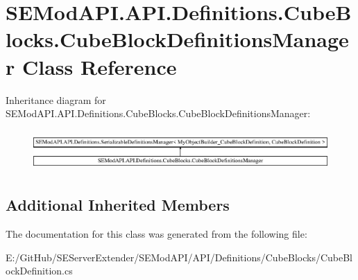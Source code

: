 \hypertarget{class_s_e_mod_a_p_i_1_1_a_p_i_1_1_definitions_1_1_cube_blocks_1_1_cube_block_definitions_manager}{}\section{S\+E\+Mod\+A\+P\+I.\+A\+P\+I.\+Definitions.\+Cube\+Blocks.\+Cube\+Block\+Definitions\+Manager Class Reference}
\label{class_s_e_mod_a_p_i_1_1_a_p_i_1_1_definitions_1_1_cube_blocks_1_1_cube_block_definitions_manager}
Inheritance diagram for S\+E\+Mod\+A\+P\+I.\+A\+P\+I.\+Definitions.\+Cube\+Blocks.\+Cube\+Block\+Definitions\+Manager\+:\begin{figure}[H]
\begin{center}
\leavevmode
\includegraphics[height=1.575246cm]{class_s_e_mod_a_p_i_1_1_a_p_i_1_1_definitions_1_1_cube_blocks_1_1_cube_block_definitions_manager}
\end{center}
\end{figure}
\subsection*{Additional Inherited Members}


The documentation for this class was generated from the following file\+:\begin{DoxyCompactItemize}
\item 
E\+:/\+Git\+Hub/\+S\+E\+Server\+Extender/\+S\+E\+Mod\+A\+P\+I/\+A\+P\+I/\+Definitions/\+Cube\+Blocks/Cube\+Block\+Definition.\+cs\end{DoxyCompactItemize}
